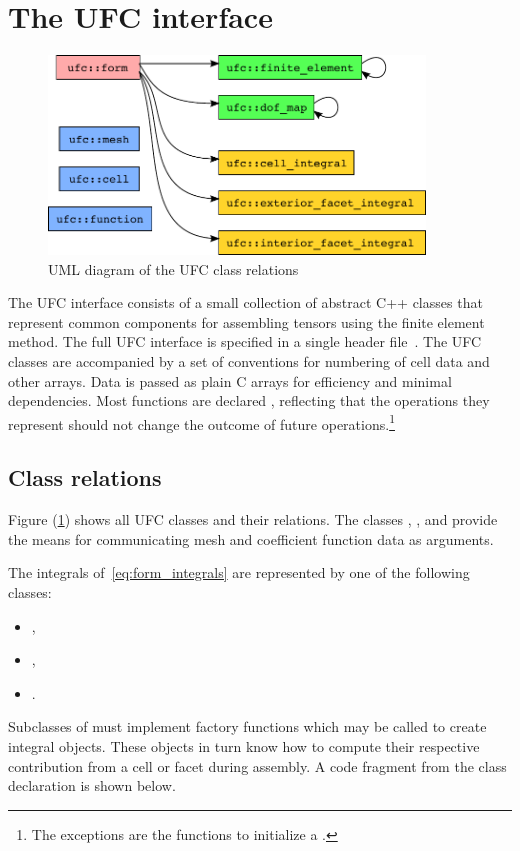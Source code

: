 \section{The UFC interface}
\label{sec:ufc:syntax}

\begin{figure}
  \begin{center}
    \includegraphics[width=10cm]{chapters/alnes-2/pdf/ufc_classes.pdf}
    \caption{UML diagram of the UFC class relations}
    \label{fig:uml}
  \end{center}
\end{figure}

The UFC interface consists of a small collection of abstract C++
classes that represent common components for assembling tensors using
the finite element method. The full UFC interface is specified in a
single header file~. The UFC classes are accompanied by a
set of conventions for numbering of cell data and other arrays. Data
is passed as plain C arrays for efficiency and minimal dependencies.
Most functions are declared , reflecting that the
operations they represent should not change the outcome of future
operations.\footnote{The exceptions are the functions to initialize a
  .}

\subsection{Class relations}

Figure (\ref{fig:uml}) shows all UFC classes and their relations. The
classes , , and  provide the means
for communicating mesh and coefficient function data as
arguments.

The integrals of~\eqref{eq:form_integrals} are represented by one of
the following classes:
\begin{itemize}
\item
  ,
\item
  ,
\item
  .
\end{itemize}
Subclasses of  must implement factory functions which may be
called to create integral objects. These objects in turn know how to
compute their respective contribution from a cell or facet during
assembly. A code fragment from the  class declaration is
shown below.

